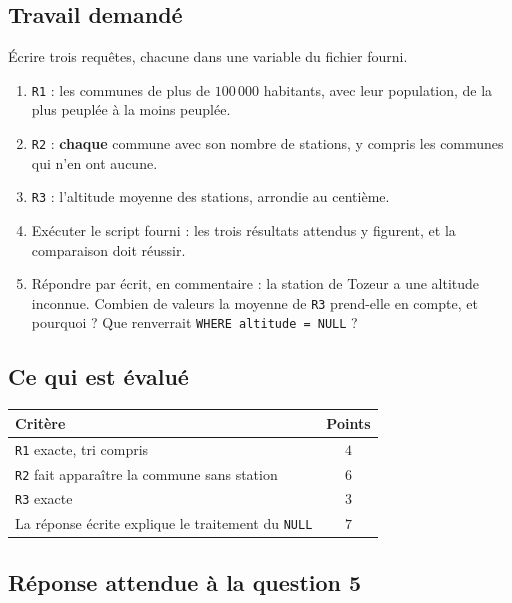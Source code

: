 \subsection*{Travail demandé}

Écrire trois requêtes, chacune dans une variable du fichier fourni.

\begin{enumerate}
  \item \lstinline{R1} : les communes de plus de $100\,000$ habitants, avec
    leur population, de la plus peuplée à la moins peuplée.

  \item \lstinline{R2} : \textbf{chaque} commune avec son nombre de stations,
    y compris les communes qui n'en ont aucune.

  \item \lstinline{R3} : l'altitude moyenne des stations, arrondie au
    centième.

  \item Exécuter le script fourni : les trois résultats attendus y figurent, et
    la comparaison doit réussir.

  \item Répondre par écrit, en commentaire : la station de Tozeur a une
    altitude inconnue. Combien de valeurs la moyenne de \lstinline{R3}
    prend-elle en compte, et pourquoi ? Que renverrait
    \lstinline{WHERE altitude = NULL} ?
\end{enumerate}

\subsection*{Ce qui est évalué}

\begin{center}
\begin{tabular}{|l|c|}
\hline
\textbf{Critère} & \textbf{Points} \\
\hline
\texttt{R1} exacte, tri compris & $4$ \\
\hline
\texttt{R2} fait apparaître la commune sans station & $6$ \\
\hline
\texttt{R3} exacte & $3$ \\
\hline
La réponse écrite explique le traitement du \texttt{NULL} & $7$ \\
\hline
\end{tabular}
\end{center}

\subsection*{Réponse attendue à la question 5}

